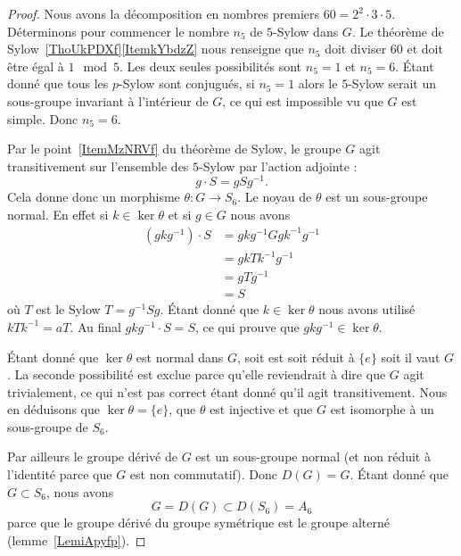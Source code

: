 \begin{proof}
    Nous avons la décomposition en nombres premiers \( 60=2^2\cdot 3\cdot 5\). Déterminons pour commencer le nombre \( n_5\) de \( 5\)-Sylow dans \( G\). Le théorème de Sylow~\ref{ThoUkPDXf}\ref{ItemkYbdzZ} nous renseigne que \( n_5\) doit diviser \( 60\) et doit être égal à \( 1\mod 5\). Les deux seules possibilités sont \( n_5=1\) et \( n_5=6\). Étant donné que tous les \( p\)-Sylow sont conjugués, si \( n_5=1\) alors le \( 5\)-Sylow serait un sous-groupe invariant à l'intérieur de $G$, ce qui est impossible vu que \( G\) est simple. Donc \( n_5=6\).

    Par le point~\ref{ItemMzNRVf} du théorème de Sylow, le groupe \( G\) agit transitivement sur l'ensemble des \( 5\)-Sylow par l'action adjointe :
    \begin{equation}
        g\cdot S=gSg^{-1}.
    \end{equation}
    Cela donne donc un morphisme \( \theta\colon G\to S_6\). Le noyau de \( \theta\) est un sous-groupe normal. En effet si \( k\in \ker\theta\) et si \( g\in G\) nous avons
    \begin{subequations}
        \begin{align}
            (gkg^{-1})\cdot S&=gkg^{-1} Ggk^{-1}g^{-1}\\
            &=gkTk^{-1}g^{-1}\\
            &=gTg^{-1}\\
            &=S
        \end{align}
    \end{subequations}
    où \( T\) est le Sylow \( T=g^{-1}Sg\). Étant donné que \( k\in \ker\theta\) nous avons utilisé \( kTk^{-1}=aT\). Au final \( gkg^{-1}\cdot S=S\), ce qui prouve que \( gkg^{-1} \in\ker\theta\).

    Étant donné que \( \ker\theta\) est normal dans \( G\), soit est soit réduit à \( \{ e \}\) soit il vaut \( G\). La seconde possibilité est exclue parce qu'elle reviendrait à dire que \( G\) agit trivialement, ce qui n'est pas correct étant donné qu'il agit transitivement. Nous en déduisons que \( \ker\theta=\{ e \}\), que \( \theta\) est injective et que \( G\) est isomorphe à un sous-groupe de \( S_6\).

    Par ailleurs le groupe dérivé de \( G\) est un sous-groupe normal (et non réduit à l'identité parce que \( G\) est non commutatif). Donc \( D(G)=G\). Étant donné que \( G\subset S_6\), nous avons
    \begin{equation}
        G=D(G)\subset D(S_6)=A_6
    \end{equation}
    parce que le groupe dérivé du groupe symétrique est le groupe alterné (lemme~\ref{LemiApyfp}).


\end{proof}
